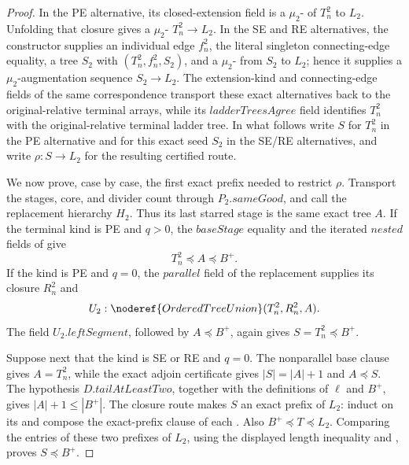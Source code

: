 \begin{proof}
In the PE alternative, its closed-extension field is a
\(\mu_2\)- of \(T_n^2\) to \(L_2\).  Unfolding
that closure gives a
\(\mu_2\)-
\(T_n^2\longrightarrow L_2\).  In the SE and RE alternatives, the
constructor supplies an individual edge \(f_n^2\), the literal singleton
connecting-edge equality, a tree \(S_2\) with
\((T_n^2,f_n^2,S_2)\), and a
\(\mu_2\)- from \(S_2\) to \(L_2\); hence it
supplies a \(\mu_2\)-augmentation sequence
\(S_2\longrightarrow L_2\).  The extension-kind and connecting-edge
fields of the same correspondence transport these exact alternatives
back to the original-relative terminal arrays, while its
\(\mathit{ladderTreesAgree}\) field identifies \(T_n^2\) with the
original-relative terminal ladder tree.  In what follows write
\(S\) for \(T_n^2\) in the PE alternative and for this exact seed
\(S_2\) in the SE/RE alternatives, and write
\(\rho:S\longrightarrow L_2\) for the resulting certified route.

We now prove, case by case, the first exact prefix needed to restrict
\(\rho\).  Transport the stages, core, and divider count through
\(P_2.\mathit{sameGood}\), and call the replacement hierarchy \(H_2\).
Thus its last starred stage is the same exact tree \(A\).
If the terminal kind is PE and \(q>0\), the
\(\mathit{baseStage}\) equality and the iterated
\(\mathit{nested}\) fields of  give
\[
                      T_n^2\preccurlyeq A\preccurlyeq B^+.
\]
If the kind is PE and \(q=0\), the
\(\mathit{parallel}\) field of the replacement
 supplies its closure \(R_n^2\) and
\[
 U_2:\noderef{OrderedTreeUnion}(T_n^2,R_n^2,A).
\]
The field \(U_2.\mathit{leftSegment}\), followed by
\(A\preccurlyeq B^+\), again gives \(S=T_n^2\preccurlyeq B^+\).

Suppose next that the kind is SE or RE and \(q=0\).  The nonparallel
base clause gives \(A=T_n^2\), while the exact adjoin certificate gives
\(|S|=|A|+1\) and \(A\preccurlyeq S\).  The hypothesis
\(D.\mathit{tailAtLeastTwo}\), together with the definitions of
\(\ell\) and \(B^+\), gives \(|A|+1\leq|B^+|\).  The closure route makes
\(S\) an exact prefix of \(L_2\): induct on its
 and compose the exact-prefix
clause of each .  Also
\(B^+\preccurlyeq T\preccurlyeq L_2\).  Comparing the entries of these
two prefixes of \(L_2\), using the displayed length inequality and
, proves \(S\preccurlyeq B^+\).


\end{proof}
